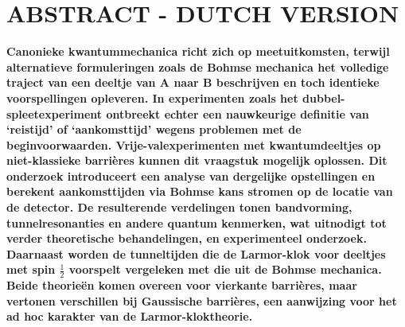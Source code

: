 \section*{ABSTRACT - DUTCH VERSION}
\label{dutch-abstract}

\textbf{Canonieke kwantummechanica richt zich op meetuitkomsten, terwijl alternatieve formuleringen zoals de Bohmse mechanica het volledige traject van een deeltje van A naar B beschrijven en toch identieke voorspellingen opleveren. In experimenten zoals het dubbel-spleetexperiment ontbreekt echter een nauwkeurige definitie van ‘reistijd’ of ‘aankomsttijd’ wegens problemen met de beginvoorwaarden. Vrije-valexperimenten met kwantumdeeltjes op niet-klassieke barrières kunnen dit vraagstuk mogelijk oplossen. Dit onderzoek introduceert een analyse van dergelijke opstellingen en berekent aankomsttijden via Bohmse kans stromen op de locatie van de detector. De resulterende verdelingen tonen bandvorming, tunnelresonanties en andere quantum kenmerken, wat uitnodigt tot verder theoretische behandelingen, en experimenteel onderzoek. Daarnaast worden de tunneltijden die de Larmor-klok voor deeltjes met spin $\frac{1}{2}$ voorspelt vergeleken met die uit de Bohmse mechanica. Beide theorieën komen overeen voor vierkante barrières, maar vertonen verschillen bij Gaussische barrières, een aanwijzing voor het ad hoc karakter van de Larmor-kloktheorie.}